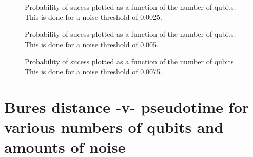 \pagebreak

\begin{figure}[h]
\begin{center}
\end{center}
\caption{Probability of sucess plotted as a function of the number of qubits. This
is done for a noise threshold of 0.0025.}
\end{figure}

\pagebreak

\begin{figure}[h]
\begin{center}
\end{center}
\caption{Probability of sucess plotted as a function of the number of qubits. This
is done for a noise threshold of 0.005.}
\end{figure}

\pagebreak

\begin{figure}[h]
\begin{center}
\end{center}
\caption{Probability of sucess plotted as a function of the number of qubits. This
is done for a noise threshold of 0.0075.}
\end{figure}


\pagebreak

\vfill
\section{Bures distance -v- pseudotime for various numbers of qubits and
amounts of noise}
\vfill

\pagebreak


